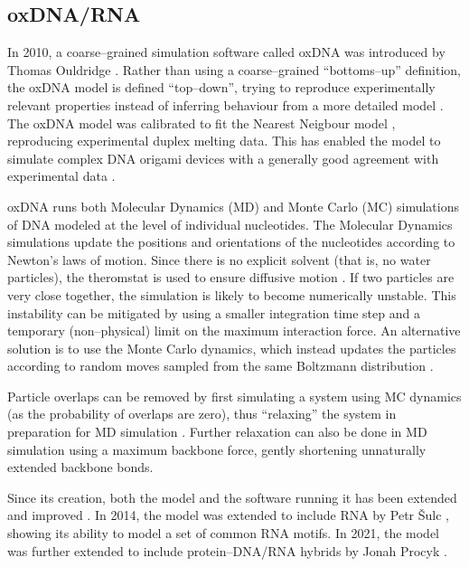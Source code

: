 \subsection{oxDNA/RNA}
\label{sec:oxDNA}

In 2010, a coarse--grained simulation software called oxDNA was introduced by Thomas Ouldridge \cite{ouldridge2010dna}. Rather than using a coarse--grained ``bottoms--up'' definition, the oxDNA model is defined ``top--down'', trying to reproduce experimentally relevant properties instead of inferring behaviour from a more detailed model \cite{sengar2021primer}. The oxDNA model was calibrated to fit the Nearest Neigbour model \cite{santalucia1998unified}, reproducing experimental duplex melting data. This has enabled the model to simulate complex DNA origami devices with a generally good agreement with experimental data \cite{sharma2017characterizing}.

oxDNA runs both Molecular Dynamics (MD) and Monte Carlo (MC) simulations of DNA modeled at the level of individual nucleotides. The Molecular Dynamics simulations update the positions and orientations of the nucleotides according to Newton's laws of motion. Since there is no explicit solvent (that is, no water particles), the theromstat is used to ensure diffusive motion \cite{sengar2021primer}. If two particles are very close together, the simulation is likely to become numerically unstable. This instability can be mitigated by using a smaller integration time step and a temporary (non--physical) limit on the maximum interaction force. An alternative solution is to use the Monte Carlo dynamics, which instead updates the particles according to random moves sampled from the same Boltzmann distribution \cite{sengar2021primer}.

Particle overlaps can be removed by first simulating a system using MC dynamics (as the probability of overlaps are zero), thus ``relaxing'' the system in preparation for MD simulation \cite{doye2020oxdna}. Further relaxation can also be done in MD simulation using a maximum backbone force, gently shortening unnaturally extended backbone bonds. 

Since its creation, both the model and the software running it has been extended and improved \cite{ouldridge2011structural, rovigatti2015comparison, sulc2012Sequence, ouldridge2013optimizing, snodin2015introducing}. In 2014, the model was extended to include RNA by Petr {\v{S}}ulc \cite{vsulc2014nucleotide}, showing its ability to model a set of common RNA motifs. In 2021, the model was further extended to include protein--DNA/RNA hybrids by Jonah Procyk \cite{procyk2021coarse}.


